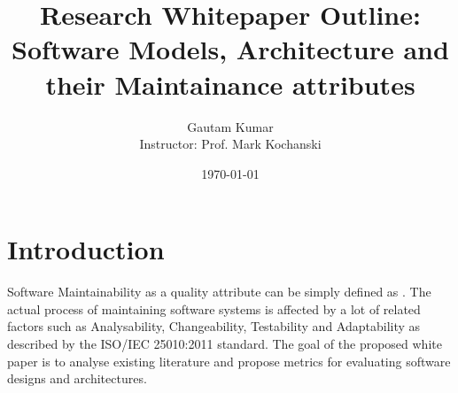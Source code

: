 \documentclass[dvips,12pt]{article}
\begin{document}

\title{Research Whitepaper Outline: \\
Software Models, Architecture and their Maintainance attributes}
\author{Gautam Kumar\\
Instructor: Prof. Mark Kochanski}
\date{\today}


\maketitle


\section{Introduction}

Software Maintainability as a quality attribute can be simply defined as
\cite{zhu_software_2005}. The actual process of maintaining software systems is affected by a lot of related factors such as Analysability, Changeability, Testability and Adaptability as described by the ISO/IEC 25010:2011 standard. The goal of the proposed white paper is to analyse existing literature and propose metrics for evaluating software designs and architectures. 
\end{document}
